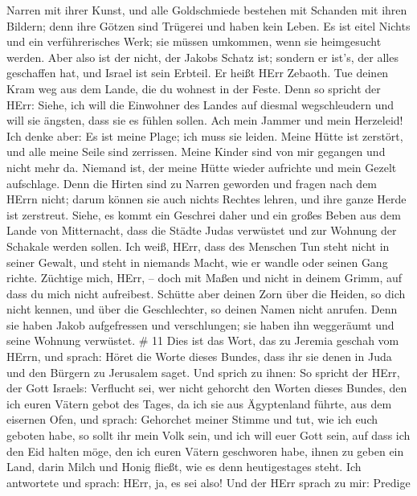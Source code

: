 Narren mit ihrer Kunst, und alle Goldschmiede bestehen mit Schanden mit
ihren Bildern; denn ihre Götzen sind Trügerei und haben kein Leben.
 Es ist eitel Nichts und ein verführerisches Werk; sie
müssen umkommen, wenn sie heimgesucht werden.  Aber also
ist der nicht, der Jakobs Schatz ist; sondern er ist's, der alles
geschaffen hat, und Israel ist sein Erbteil. Er heißt HErr Zebaoth.
 Tue deinen Kram weg aus dem Lande, die du wohnest in der
Feste.  Denn so spricht der HErr: Siehe, ich will die
Einwohner des Landes auf diesmal wegschleudern und will sie ängsten,
dass sie es fühlen sollen.  Ach mein Jammer und mein
Herzeleid! Ich denke aber: Es ist meine Plage; ich muss sie leiden.
 Meine Hütte ist zerstört, und alle meine Seile sind
zerrissen. Meine Kinder sind von mir gegangen und nicht mehr da. Niemand
ist, der meine Hütte wieder aufrichte und mein Gezelt aufschlage.
 Denn die Hirten sind zu Narren geworden und fragen nach
dem HErrn nicht; darum können sie auch nichts Rechtes lehren, und ihre
ganze Herde ist zerstreut.  Siehe, es kommt ein Geschrei
daher und ein großes Beben aus dem Lande von Mitternacht, dass die
Städte Judas verwüstet und zur Wohnung der Schakale werden sollen.
 Ich weiß, HErr, dass des Menschen Tun steht nicht in
seiner Gewalt, und steht in niemands Macht, wie er wandle oder seinen
Gang richte.  Züchtige mich, HErr, -- doch mit Maßen und
nicht in deinem Grimm, auf dass du mich nicht aufreibest. 
Schütte aber deinen Zorn über die Heiden, so dich nicht kennen, und über
die Geschlechter, so deinen Namen nicht anrufen. Denn sie haben Jakob
aufgefressen und verschlungen; sie haben ihn weggeräumt und seine
Wohnung verwüstet. \# 11  Dies ist das Wort, das zu Jeremia
geschah vom HErrn, und sprach:  Höret die Worte dieses
Bundes, dass ihr sie denen in Juda und den Bürgern zu Jerusalem saget.
 Und sprich zu ihnen: So spricht der HErr, der Gott Israels:
Verflucht sei, wer nicht gehorcht den Worten dieses Bundes, 
den ich euren Vätern gebot des Tages, da ich sie aus Ägyptenland führte,
aus dem eisernen Ofen, und sprach: Gehorchet meiner Stimme und tut, wie
ich euch geboten habe, so sollt ihr mein Volk sein, und ich will euer
Gott sein,  auf dass ich den Eid halten möge, den ich euren
Vätern geschworen habe, ihnen zu geben ein Land, darin Milch und Honig
fließt, wie es denn heutigestages steht. Ich antwortete und sprach:
HErr, ja, es sei also!  Und der HErr sprach zu mir: Predige
